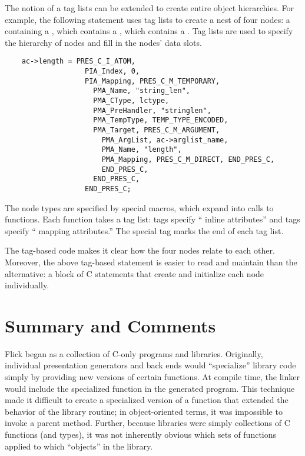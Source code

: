 The notion of a tag lists can be extended to create entire object hierarchies.
For example, the following statement uses tag lists to create a nest of four
\PRESC{} nodes: a  containing a
, which contains a
, which contains a
\@.  Tag lists are used to specify the
hierarchy of nodes and fill in the nodes' data slots.

\begin{verbatim}
    ac->length = PRES_C_I_ATOM,
                   PIA_Index, 0,
                   PIA_Mapping, PRES_C_M_TEMPORARY,
                     PMA_Name, "string_len",
                     PMA_CType, lctype,
                     PMA_PreHandler, "stringlen",
                     PMA_TempType, TEMP_TYPE_ENCODED,
                     PMA_Target, PRES_C_M_ARGUMENT,
                       PMA_ArgList, ac->arglist_name,
                       PMA_Name, "length",
                       PMA_Mapping, PRES_C_M_DIRECT, END_PRES_C,
                       END_PRES_C,
                     END_PRES_C,
                   END_PRES_C;
\end{verbatim}

The node types are specified by special  macros, which
expand into calls to functions.  Each function takes a tag list:
 tags specify ``\PRESC{} inline attributes'' and
 tags specify ``\PRESC{} mapping attributes.''  The special
tag  marks the end of each tag list.

The tag-based code makes it clear how the four nodes relate to each other.
Moreover, the above tag-based statement is easier to read and maintain than the
alternative: a block of C statements that create and initialize each node
individually.



\section{Summary and Comments}
\label{sec:Coding:Summary and Comments}

Flick began as a collection of C-only programs and libraries.  Originally,
individual presentation generators and back ends would ``specialize'' library
code simply by providing new versions of certain functions.  At compile time,
the linker would include the specialized function in the generated program.
This technique made it difficult to create a specialized version of a function
that extended the behavior of the library routine; in object-oriented terms, it
was impossible to invoke a parent method.  Further, because libraries were
simply collections of C functions (and types), it was not inherently obvious
which sets of functions applied to which ``objects'' in the library.

